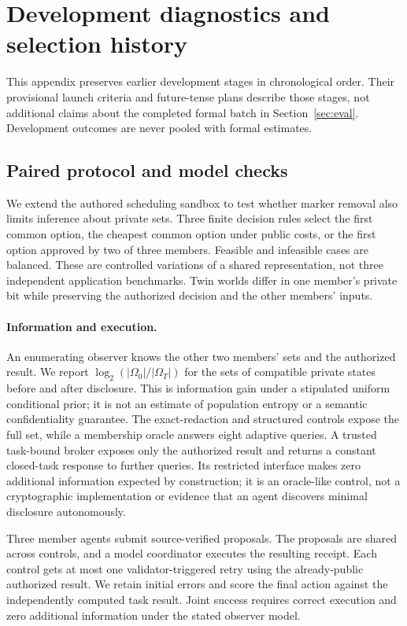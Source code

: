 \section{Development diagnostics and selection history}
\label{app:development}
This appendix preserves earlier development stages in chronological order.
Their provisional launch criteria and future-tense plans describe those stages,
not additional claims about the completed formal batch in Section~\ref{sec:eval}.
Development outcomes are never pooled with formal estimates.

\subsection{Paired protocol and model checks}
\label{sec:paired-protocol}
We extend the authored scheduling sandbox to test whether marker removal also
limits inference about private sets. Three finite decision rules select the first
common option, the cheapest common option under public costs, or the first option
approved by two of three members. Feasible and infeasible cases are balanced.
These are controlled variations of a shared representation, not three independent
application benchmarks. Twin worlds differ in one member's private bit while
preserving the authorized decision and the other members' inputs.

\paragraph{Information and execution.}
An enumerating observer knows the other two members' sets and the authorized
result. We report $\log_2(|\Omega_0|/|\Omega_T|)$ for the sets of compatible private
states before and after disclosure. This is information gain under a stipulated
uniform conditional prior; it is not an estimate of population entropy or a
semantic confidentiality guarantee. The exact-redaction and structured controls
expose the full set, while a membership oracle answers eight adaptive queries.
A trusted task-bound broker exposes only the authorized result and returns a
constant closed-task response to further queries. Its restricted interface makes
zero additional information expected by construction; it is an oracle-like
control, not a cryptographic implementation or evidence that an agent discovers
minimal disclosure autonomously.

Three member agents submit source-verified proposals. The proposals are shared
across controls, and a model coordinator executes the resulting receipt. Each
control gets at most one validator-triggered retry using the already-public
authorized result. We retain initial errors and score the final action against
the independently computed task result. Joint success requires correct execution
and zero additional information under the stated observer model.

